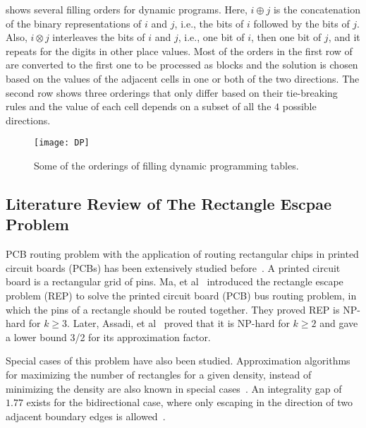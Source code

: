 \documentclass[preprint,12pt]{elsarticle}
\begin{document}
 shows several filling orders for dynamic programs. Here, $i\oplus j$ is the concatenation of the binary representations of $i$ and $j$, i.e., the bits of $i$ followed by the bits of $j$. Also, $i\otimes j$ interleaves the bits of $i$ and $j$, i.e., one bit of $i$, then one bit of $j$, and it repeats for the digits in other place values. Most of the orders in the first row of  are converted to the first one to be processed as blocks and the solution is chosen based on the values of the adjacent cells in one or both of the two directions. The second row shows three orderings that only differ based on their tie-breaking rules and the value of each cell depends on a subset of all the $4$ possible directions.

\begin{figure}[h]
\centering
\texttt{[image: DP]}
\caption{Some of the orderings of filling dynamic programming tables.}\label{fig:fill}
\end{figure}

\subsection{Literature Review of The Rectangle Escpae Problem}\label{app:rep}
PCB routing problem with the application of routing rectangular chips in printed circuit boards (PCBs) has been extensively studied before~\cite{routing,obstacle,ma,kong,zar1,boundary,fixed,roy2016runaway}. A printed circuit board is a rectangular grid of pins. Ma, et al~\cite{ma} introduced the rectangle escape problem (REP) to solve the printed circuit board (PCB) bus routing problem, in which the pins of a rectangle should be routed together. They proved REP is NP-hard for $k\geq 3$. Later, Assadi, et al~\cite{zar1} proved that it is NP-hard for $k\geq 2$ and gave a lower bound 3/2 for its approximation factor.

Special cases of this problem have also been studied. Approximation algorithms for maximizing the number of rectangles for a given density, instead of minimizing the density are also known in special cases~\cite{boundary,fixed,chan,chanp,erl}.
An integrality gap of $1.77$ exists for the bidirectional case, where only escaping in the direction of two adjacent boundary edges is allowed~\cite{ahmadinejad2017rectangle}.
\end{document}
